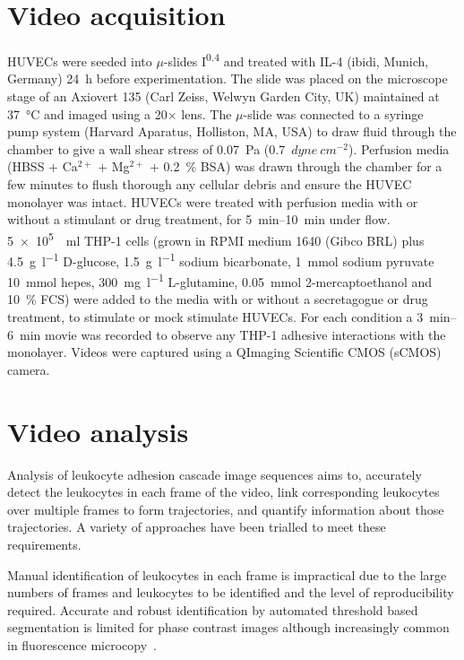 \section{Video acquisition}
\label{leukocytes:acquisition}
HUVECs were seeded into $\mu$-slides I\textsuperscript{0.4} and treated with IL-4 (ibidi, Munich, Germany) \SI{24}{\hour} before experimentation. The slide was placed on the microscope stage of an Axiovert 135 (Carl Zeiss, Welwyn Garden City, UK) maintained at \SI{37}{\celsius} and imaged using a 20$\times$ lens. The $\mu$-slide was connected to a syringe pump system (Harvard Aparatus, Holliston, MA, USA) to draw fluid through the chamber to give a wall shear stress of \SI{0.07}{\pascal} (0.7~$dyne~cm^{-2}$). Perfusion media (HBSS $+$ Ca$^{2+}$ $+$ Mg$^{2+}$ $+$ 0.2~\% BSA) was drawn through the chamber for a few minutes to flush thorough any cellular debris and ensure the HUVEC monolayer was intact. HUVECs were treated with perfusion media with or without a stimulant or drug treatment, for \SIrange{5}{10}{\minute} under flow. \SI{5e5}{\per\milli\litre} THP-1 cells (grown in RPMI medium 1640 (Gibco BRL) plus \SI{4.5}{\gram\per\litre} D-glucose, \SI{1.5}{\gram\per\litre} sodium bicarbonate, \SI{1}{\mmol} sodium pyruvate \SI{10}{\mmol} hepes, \SI{300}{\milli\gram\per\litre} L-glutamine, \SI{0.05}{\mmol} 2-mercaptoethanol and 10~\% FCS) were added to the media with or without a secretagogue or drug treatment, to stimulate or mock stimulate HUVECs. For each condition a \SIrange{3}{6}{\minute} movie was recorded to observe any THP-1 adhesive interactions with the monolayer. Videos were captured using a QImaging Scientific CMOS (sCMOS) camera.

\section{Video analysis}
\label{leukocytes:analysis}
Analysis of leukocyte adhesion cascade image sequences aims to, accurately detect the leukocytes in each frame of the video, link corresponding leukocytes over multiple frames to form trajectories, and quantify information about those trajectories. A variety of approaches have been trialled to meet these requirements.

Manual identification of leukocytes in each frame is impractical due to the large numbers of frames and leukocytes to be identified and the level of reproducibility required. Accurate and robust identification by automated threshold based segmentation is limited for phase contrast images although increasingly common in fluorescence microcopy~\cite{Hand2009}.

